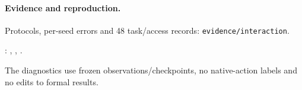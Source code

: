 \paragraph{Evidence and reproduction.}
Protocols, per-seed errors and 48 task/access records: \texttt{evidence/interaction}.
{\raggedright\noindent{}:
, ,
.\par}
The diagnostics use frozen observations/checkpoints, no native-action
labels and no edits to formal results.

